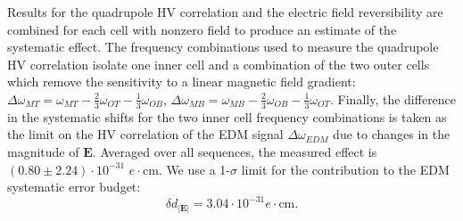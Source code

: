 \documentclass [10pt, twoside] {uwthesis}[2012/04/02]
\begin{document}
Results for the quadrupole HV correlation and the electric field reversibility are combined for each cell with nonzero field to produce an estimate of the systematic effect. The frequency combinations used to measure the quadrupole HV correlation isolate one inner cell and a combination of the two outer cells which remove the sensitivity to a linear magnetic field gradient: $\Delta\omega_{MT} = \omega_{MT} - \frac{2}{3}\omega_{OT} - \frac{1}{3}\omega_{OB}$, $\Delta\omega_{MB} = \omega_{MB} - \frac{2}{3}\omega_{OB} - \frac{1}{3}\omega_{OT}$. Finally, the difference in the systematic shifts for the two inner cell frequency combinations is taken as the limit on the HV correlation of the EDM signal $\Delta\omega_{EDM}$ due to changes in the magnitude of $\mathbf{E}$. Averaged over all sequences, the measured effect is $(0.80 \pm 2.24) \cdot 10^{-31}$ $e \cdot \text{cm}$. We use a 1-$\sigma$ limit for the contribution to the EDM systematic error budget: 
\begin{equation}
\delta d_{|\mathbf{E}|} = 3.04 \cdot 10^{-31} e \cdot \text{cm}.  
\end{equation}
\end{document}
